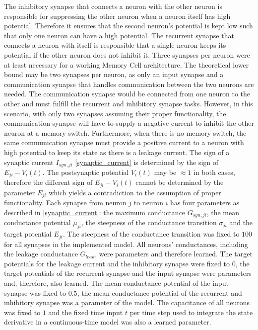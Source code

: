 \documentclass[draft,final]{vutinfth} %
\begin{document}
    The inhibitory synapse that connects a neuron with the other neuron is responsible for suppressing the other neuron when a neuron itself has high potential. Therefore it ensures that the second neuron's potential is kept low such that only one neuron can have a high potential.
    The recurrent synapse that connects a neuron with itself is responsible that a single neuron keeps its potential if the other neuron does not inhibit it.
    Three synapses per neuron were at least necessary for a working Memory Cell architecture.
    The theoretical lower bound may be two synapses per neuron, as only an input synapse and a communication synapse that handles communication between the two neurons are needed.
    The communication synapse would be connected from one neuron to the other and must fulfill the recurrent and inhibitory synapse tasks.
    However, in this scenario, with only two synapses assuming their proper functionality, the communication synapse will have to supply a negative current to inhibit the other neuron at a memory switch.
    Furthermore, when there is no memory switch, the same communication synapse must provide a positive current to a neuron with high potential to keep its state as there is a leakage current.
    The sign of a synaptic current $I_{syn,ji}$ \ref{synaptic_current} is determined by the sign of $E_{ji} - V_i(t)$.
    The postsynaptic potential $V_i(t)$ may be $\approx 1$ in both cases, therefore the different sign of $E_{ji} - V_i(t)$ cannot be determined by the parameter $E_{ji}$ which yields a contradiction to the assumption of proper functionality.
    Each synapse from neuron $j$ to neuron $i$ has four parameters as described in \ref{synaptic_current}: the maximum conductance $G_{syn,ji}$, the mean conductance potential $\mu_{ji}$, the steepness of the conductance transition $\sigma_{ji}$ and the target potential $E_{ji}$.
    The steepness of the conductance transition was fixed to $100$ for all synapses in the implemented model.
    All neurons' conductances, including the leakage conductance $G_{leak}$, were parameters and therefore learned.
    The target potentials for the leakage current and the inhibitory synapse were fixed to $0$, the target potentials of the recurrent synapse and the input synapse were parameters and, therefore, also learned.
    The mean conductance potential of the input synapse was fixed to $0.5$, the mean conductance potential of the recurrent and inhibitory synapse was a parameter of the model.
    The capacitance of all neurons was fixed to $1$ and the fixed time input $t$ per time step used to integrate the state derivative in a continuous-time model was also a learned parameter.
\end{document}
